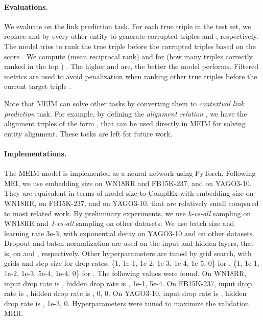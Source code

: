\documentclass{article}
\theoremstyle{plain}
\theoremstyle{remark}
\begin{document}
\paragraph{Evaluations.} We evaluate on the link prediction task. For each true triple  in the test set, we replace  and  by every other entity to generate corrupted triples  and , respectively. The model tries to rank the true triple  before the corrupted triples based on the score . We compute  (mean reciprocal rank) and  for  (how many triples correctly ranked in the top ) \cite{trouillon_complexembeddingssimple_2016}. The higher  and  are, the better the model performs. Filtered metrics are used to avoid penalization when ranking other true triples before the current target triple \cite{bordes_translatingembeddingsmodeling_2013}.

Note that MEIM can solve other tasks by converting them to \textit{contextual link prediction} task. For example, by defining the \textit{alignment relation} , we have the alignment triples of the form , that can be used directly in MEIM for solving entity alignment. These tasks are left for future work.

\paragraph{Implementations.} The MEIM model is implemented as a neural network using PyTorch. Following MEI, we use embedding size  on WN18RR and FB15K-237, and  on YAGO3-10. They are equivalent in terms of model size to ComplEx with embedding size  on WN18RR,  on FB15K-237, and  on YAGO3-10, that are relatively small compared to most related work. By preliminary experiments, we use \textit{k-vs-all} sampling on WN18RR and \textit{1-vs-all} sampling on other datasets. We use batch size  and learning rate 3e-3, with exponential decay  on YAGO3-10 and  on other datasets. Dropout and batch normalization are used on the input and hidden layers, that is, on  and , respectively. Other hyperparameters are tuned by grid search, with grids  and step size  for drop rates, \{1, 1e-1, 1e-2, 1e-3, 1e-4, 1e-5, 0\} for , \{1, 1e-1, 1e-2, 1e-3, 5e-4, 1e-4, 0\} for . The following values were found. On WN18RR, input drop rate is , hidden drop rate is ,  1e-1,  5e-4. On FB15K-237, input drop rate is , hidden drop rate is ,  0,  0. On YAGO3-10, input drop rate is , hidden drop rate is ,  1e-3,  0. Hyperparameters were tuned to maximize the validation MRR.
\end{document}
